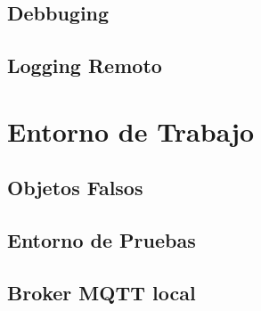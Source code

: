 \subsection{Debbuging}
\subsection{Logging Remoto}
\section{Entorno de Trabajo}
\subsection{Objetos Falsos}
\subsection{Entorno de Pruebas}
\subsection{Broker MQTT local}
% 
